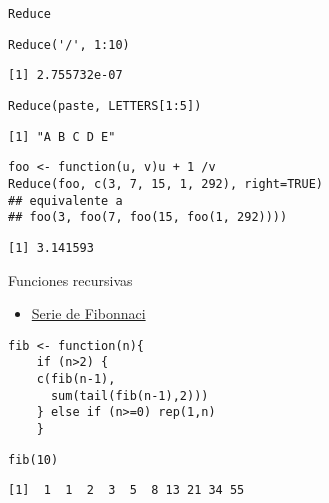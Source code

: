 \documentclass[xcolor={usenames,svgnames,dvipsnames}]{beamer}
\begin{document}
\begin{frame}[fragile,label=sec-4-4]{\texttt{Reduce}}
 \lstset{language=R,numbers=none}
\begin{lstlisting}
Reduce('/', 1:10)
\end{lstlisting}

\begin{verbatim}
[1] 2.755732e-07
\end{verbatim}

\lstset{language=R,numbers=none}
\begin{lstlisting}
Reduce(paste, LETTERS[1:5])
\end{lstlisting}

\begin{verbatim}
[1] "A B C D E"
\end{verbatim}

\lstset{language=R,numbers=none}
\begin{lstlisting}
foo <- function(u, v)u + 1 /v
Reduce(foo, c(3, 7, 15, 1, 292), right=TRUE)
## equivalente a
## foo(3, foo(7, foo(15, foo(1, 292))))
\end{lstlisting}

\begin{verbatim}
[1] 3.141593
\end{verbatim}
\end{frame}
\begin{frame}[fragile,label=sec-4-5]{Funciones recursivas}
 \begin{itemize}
\item \href{http://en.wikibooks.org/wiki/R_Programming/Working_with_functions#Functions_as_Objects}{Serie de Fibonnaci}
\end{itemize}
\lstset{language=R,numbers=none}
\begin{lstlisting}
fib <- function(n){
    if (n>2) {
	c(fib(n-1),
	  sum(tail(fib(n-1),2)))
    } else if (n>=0) rep(1,n)
    }
\end{lstlisting}

\lstset{language=R,numbers=none}
\begin{lstlisting}
fib(10)
\end{lstlisting}

\begin{verbatim}
[1]  1  1  2  3  5  8 13 21 34 55
\end{verbatim}
\end{frame}
\end{document}
